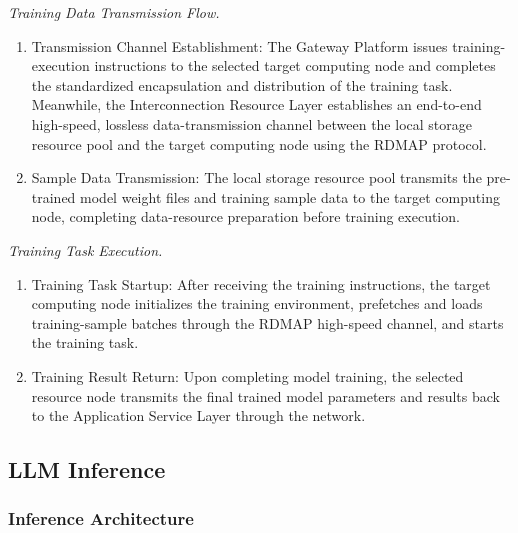 \documentclass{ccjnl}
\begin{document}
\par
{}
\noindent\textit{Training Data Transmission Flow.}\par

\begin{enumerate}[nosep,label=\arabic*)]
	\item Transmission Channel Establishment: The Gateway Platform issues training-execution instructions to the selected target computing node and completes the standardized encapsulation and distribution of the training task. Meanwhile, the Interconnection Resource Layer establishes an end-to-end high-speed, lossless data-transmission channel between the local storage resource pool and the target computing node using the RDMAP protocol.
	
	\item Sample Data Transmission: The local storage resource pool transmits the pre-trained model weight files and training sample data to the target computing node, completing data-resource preparation before training execution.
\end{enumerate}

\par
{}
\noindent\textit{Training Task Execution.}\par

\begin{enumerate}[nosep,label=\arabic*)]
	\item Training Task Startup: After receiving the training instructions, the target computing node initializes the training environment, prefetches and loads training-sample batches through the RDMAP high-speed channel, and starts the training task.
	
	\item Training Result Return: Upon completing model training, the selected resource node transmits the final trained model parameters and results back to the Application Service Layer through the network.
\end{enumerate}


\subsection{LLM Inference}
\label{s5-2}

\subsubsection{Inference Architecture}
\label{s5-2-1}
\end{document}
